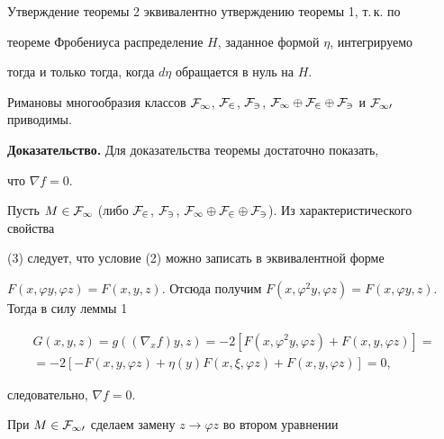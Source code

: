  


Утверждение теоремы 2 эквивалентно утверждению теоремы 1, т.\,к. по 


теореме Фробениуса распределение $H$, заданное формой $\eta$, интегрируемо 


тогда и только тогда, когда $d\eta$ обращается в нуль на $H$. 


 


\begin{thm} 


Римановы многообразия классов $\cal F_1$, $\cal F_2$, $\cal F_3$, $\cal 


F_1\oplus\cal F_2\oplus\cal F_3$ и $\cal F_{10}$ приводимы. 


\end{thm} 


 


 


{\bf Доказательство.} Для доказательства теоремы достаточно показать, 


что $\nabla f=0$. 


 


Пусть $M\in\cal F_1$ (либо $\cal F_2$, $\cal F_3$, $\cal 


F_1\oplus\cal F_2\oplus\cal F_3$). Из характеристического свойства 


(3) следует, что условие (2) можно записать в эквивалентной форме 


$F(x,\varphi y,\varphi z)=F(x,y,z)$. Отсюда получим $F(x,\varphi 


^2y,\varphi z)=F(x,\varphi y,z)$. Тогда в силу леммы 1 


\begin{multline*} 


G(x,y,z)=g((\nabla_x f)y,z)=-2[F(x,\varphi ^2y,\varphi z)+ 


F(x,y,\varphi z)]= \\ 


=-2[-F(x,y,\varphi z)+\eta(y)F(x,\xi,\varphi z)+ 


F(x,y,\varphi z)]=0, 


\end{multline*} 


следовательно, $\nabla f=0$. 


 


При $M\in\cal F_{10}$ сделаем замену $z\to\varphi z$ во втором уравнении 


